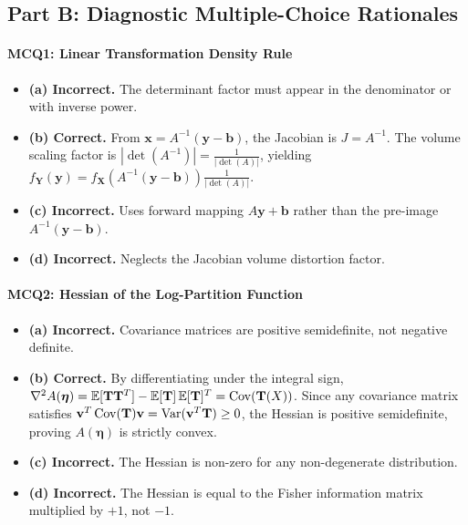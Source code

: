 \subsection*{Part B: Diagnostic Multiple-Choice Rationales}

\paragraph{MCQ1: Linear Transformation Density Rule}
\begin{itemize}
    \item \textbf{(a) Incorrect.} The determinant factor must appear in the denominator or with inverse power.
    \item \textbf{(b) Correct.} From $\mathbf{x} = A^{-1}(\mathbf{y} - \mathbf{b})$, the Jacobian is $J = A^{-1}$. The volume scaling factor is $|\det(A^{-1})| = \frac{1}{|\det(A)|}$, yielding $f_{\mathbf{Y}}(\mathbf{y}) = f_{\mathbf{X}}(A^{-1}(\mathbf{y} - \mathbf{b})) \frac{1}{|\det(A)|}$.
    \item \textbf{(c) Incorrect.} Uses forward mapping $A\mathbf{y} + \mathbf{b}$ rather than the pre-image $A^{-1}(\mathbf{y} - \mathbf{b})$.
    \item \textbf{(d) Incorrect.} Neglects the Jacobian volume distortion factor.
\end{itemize}

\paragraph{MCQ2: Hessian of the Log-Partition Function}
\begin{itemize}
    \item \textbf{(a) Incorrect.} Covariance matrices are positive semidefinite, not negative definite.
    \item \textbf{(b) Correct.} By differentiating under the integral sign, $\nabla^2 A(\boldsymbol{\eta}) = \operatorname{\mathbb{E}}[\mathbf{T}\mathbf{T}^T] - \operatorname{\mathbb{E}}[\mathbf{T}]\operatorname{\mathbb{E}}[\mathbf{T}]^T = \operatorname{Cov}(\mathbf{T}(X))$. Since any covariance matrix satisfies $\mathbf{v}^T \operatorname{Cov}(\mathbf{T})\mathbf{v} = \operatorname{Var}(\mathbf{v}^T \mathbf{T}) \ge 0$, the Hessian is positive semidefinite, proving $A(\boldsymbol{\eta})$ is strictly convex.
    \item \textbf{(c) Incorrect.} The Hessian is non-zero for any non-degenerate distribution.
    \item \textbf{(d) Incorrect.} The Hessian is equal to the Fisher information matrix multiplied by $+1$, not $-1$.
\end{itemize}

